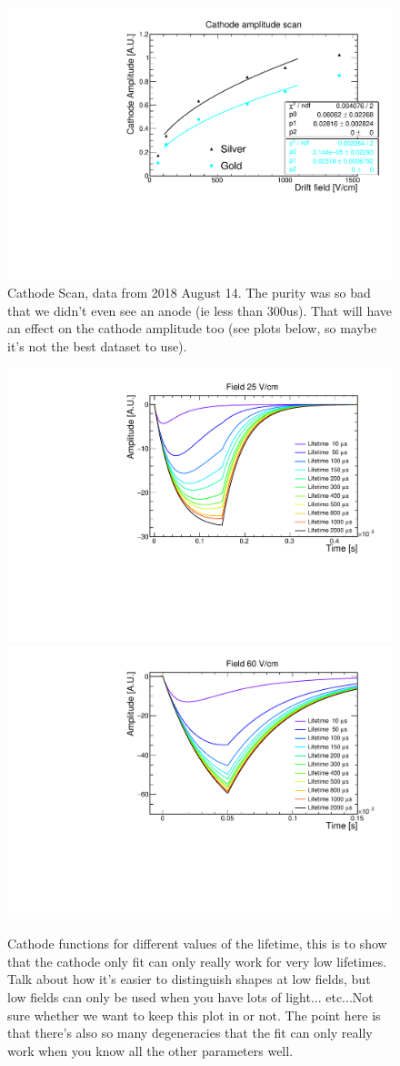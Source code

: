 \documentclass[a4paper,11pt]{article}
\begin{document}
\begin{figure}
    \centering
    \includegraphics[width=.7\linewidth]{figures/CathodeScan2018Aug14_ShortFibre_SilverGold.pdf}
    \caption{Cathode Scan, data from 2018 August 14. The purity was so bad that we didn't even see an anode (ie less than 300us). That will have an effect on the cathode amplitude too (see plots below, so maybe it's not the best dataset to use).}
    \label{fig:cathodeScan}
\end{figure}

\begin{figure}
    \centering
    \includegraphics[width=.45\linewidth]{figures/CathodeFunctions_field25.pdf}
    \includegraphics[width=.45\linewidth]{figures/CathodeFunctions_field60.pdf}
    \caption{Cathode functions for different values of the lifetime, this is to show that the cathode only fit can only really work for very low lifetimes. Talk about how it's easier to distinguish shapes at low fields, but low fields can only be used when you have lots of light... etc...Not sure whether we want to keep this plot in or not. The point here is that there's also so many degeneracies that the fit can only really work when you know all the other parameters well.}
    \label{fig:cathodeFunctions}
\end{figure}
\end{document}
